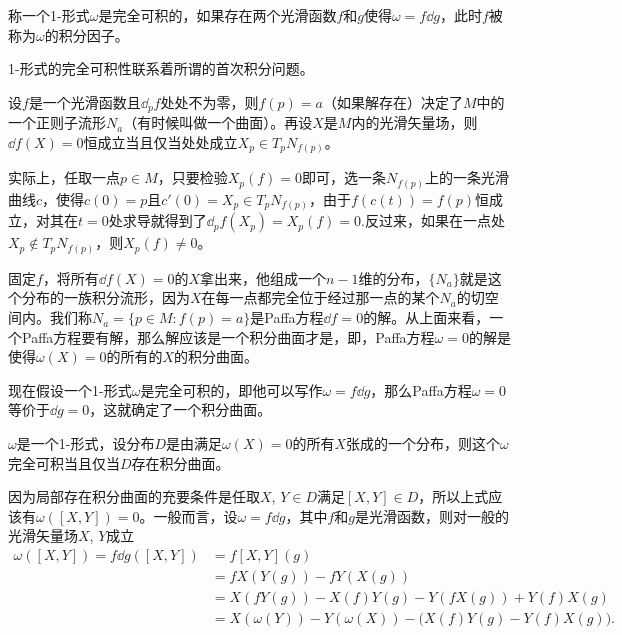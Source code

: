 \para 称一个1-形式$\omega$是完全可积的，如果存在两个光滑函数$f$和$g$使得$\omega=f\dd g$，此时$f$被称为$\omega$的积分因子。

1-形式的完全可积性联系着所谓的首次积分问题。

设$f$是一个光滑函数且$\dd_p f$处处不为零，则$f(p)=a$（如果解存在）决定了$M$中的一个正则子流形$N_a$（有时候叫做一个曲面）。再设$X$是$M$内的光滑矢量场，则$\dd f(X)=0$恒成立当且仅当处处成立$X_p\in T_pN_{f(p)}$。

实际上，任取一点$p\in M$，只要检验$X_p(f)=0$即可，选一条$N_{f(p)}$上的一条光滑曲线$c$，使得$c(0)=p$且$c'(0)=X_p\in T_pN_{f(p)}$，由于$f(c(t))=f(p)$恒成立，对其在$t=0$处求导就得到了$\dd_pf(X_p)=X_p(f)=0$.反过来，如果在一点处$X_p\notin T_pN_{f(p)}$，则$X_p(f)\neq 0$。

固定$f$，将所有$\dd f(X)=0$的$X$拿出来，他组成一个$n-1$维的分布，$\{N_a\}$就是这个分布的一族积分流形，因为$X$在每一点都完全位于经过那一点的某个$N_a$的切空间内。我们称$N_a=\{p\in M:f(p)=a\}$是Paffa方程$\dd f=0$的解。从上面来看，一个Paffa方程要有解，那么解应该是一个积分曲面才是，即，Paffa方程$\omega=0$的解是使得$\omega(X)=0$的所有的$X$的积分曲面。

现在假设一个1-形式$\omega$是完全可积的，即他可以写作$\omega=f\dd g$，那么Paffa方程$\omega=0$等价于$\dd g=0$，这就确定了一个积分曲面。

\para $\omega$是一个1-形式，设分布$D$是由满足$\omega(X)=0$的所有$X$张成的一个分布，则这个$\omega$完全可积当且仅当$D$存在积分曲面。

\para 因为局部存在积分曲面的充要条件是任取$X$, $Y\in D$满足$[X,Y]\in D$，所以上式应该有$\omega([X,Y])=0$。一般而言，设$\omega=f\dd g$，其中$f$和$g$是光滑函数，则对一般的光滑矢量场$X$, $Y$成立
\begin{equation}
\begin{split}
	\omega([X,Y])=f\dd g([X,Y])&=f [X,Y](g)\\
	&=fX(Y(g))-fY(X(g))\\
	&=X(fY(g))-X(f)Y(g)-Y(fX(g))+Y(f)X(g)\\
	&=X(\omega(Y))-Y(\omega(X))-\bigl(X(f)Y(g)-Y(f)X(g)\bigr).
\end{split}
\end{equation}

